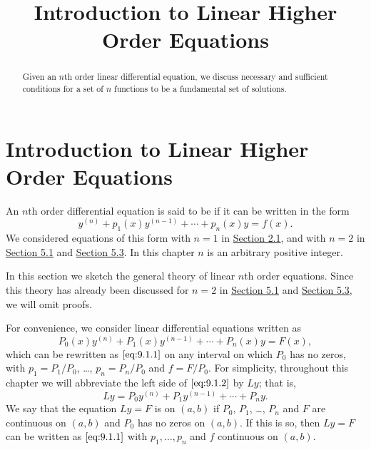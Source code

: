 \documentclass{ximera}
\title{Introduction to Linear Higher Order Equations}%
\begin{document}
\begin{abstract}
Given an $n$th order linear differential equation, we discuss necessary and sufficient conditions for a set of $n$ functions to be a fundamental set of solutions.
\end{abstract}

\maketitle

\section*{Introduction to Linear Higher Order Equations}

An $n$th order differential equation is said to be  if it
can be written in the form
\begin{equation}\label{eq:9.1.1}
y^{(n)}+p_1(x)y^{(n-1)}+\cdots+p_n(x)y=f(x).
\end{equation}
We considered equations of this form with $n=1$ in
\href{https://xerxes.ximera.org/differentialequations/main/separableEquations/separableEquations}{Section 2.1}, and with $n=2$ in
\href{https://xerxes.ximera.org/differentialequations/main/homogeneousLinearEquations/homogeneousLinearEquations}{Section 5.1} and \href{https://xerxes.ximera.org/differentialequations/main/nonHomogeneousLinear/nonHomogeneousLinear}{Section 5.3}. In this chapter $n$ is an arbitrary
positive integer.

In this section we sketch the general theory of linear $n$th order equations. Since this theory has already been discussed for $n=2$ in \href{https://xerxes.ximera.org/differentialequations/main/homogeneousLinearEquations/homogeneousLinearEquations}{Section 5.1} and \href{https://xerxes.ximera.org/differentialequations/main/nonHomogeneousLinear/nonHomogeneousLinear}{Section 5.3}, we will omit
proofs.

For convenience, we consider linear differential equations written
as
\begin{equation}\label{eq:9.1.2}
P_0(x)y^{(n)}+P_1(x)y^{(n-1)}+\cdots+P_n(x)y=F(x),
\end{equation}
which can be rewritten as $\eqref{eq:9.1.1}$ on any interval on which $P_0$ has no zeros, with $p_1=P_1/P_0$, \dots, $p_n=P_n/P_0$ and
$f=F/P_0$. For simplicity, throughout this chapter we will
abbreviate the left side of $\eqref{eq:9.1.2}$ by $Ly$; that is,
$$
Ly=P_0y^{(n)}+P_1y^{(n-1)}+\cdots+P_ny.
$$
We say that the equation $Ly=F$ is  on $(a,b)$ if
$P_0$, $P_1$, \dots, $P_n$ and $F$ are continuous on $(a,b)$ and $P_0$ has
no zeros on $(a,b)$. If this is so, then $Ly=F$ can be
written as $\eqref{eq:9.1.1}$ with $p_1, \dots, p_n$ and $f$ continuous on
$(a,b)$.
\end{document}
